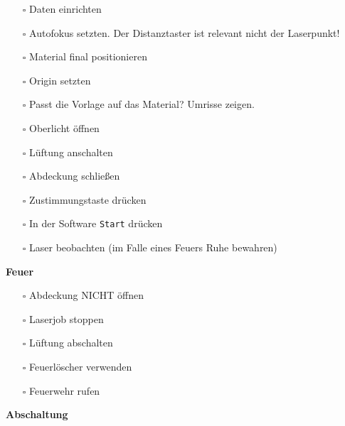 \documentclass[]{article}
\providecommand{\tightlist}{%
  \setlength{\itemsep}{0pt}\setlength{\parskip}{0pt}}
\begin{document}
\begin{itemize}
\tightlist
\item[$\square$]
  Daten einrichten\\
\item[$\square$]
  Autofokus setzten. Der Distanztaster ist relevant nicht der
  Laserpunkt!\\
\item[$\square$]
  Material final positionieren\\
\item[$\square$]
  Origin setzten\\
\item[$\square$]
  Passt die Vorlage auf das Material? Umrisse zeigen.
\item[$\square$]
  Oberlicht öffnen\\
\item[$\square$]
  Lüftung anschalten
\item[$\square$]
  Abdeckung schließen\\
\item[$\square$]
  Zustimmungstaste drücken\\
\item[$\square$]
  In der Software \texttt{Start} drücken\\
\item[$\square$]
  Laser beobachten (im Falle eines Feuers Ruhe bewahren)
\end{itemize}

\textbf{Feuer}

\begin{itemize}
\tightlist
\item[$\square$]
  Abdeckung NICHT öffnen\\
\item[$\square$]
  Laserjob stoppen\\
\item[$\square$]
  Lüftung abschalten\\
\item[$\square$]
  Feuerlöscher verwenden\\
\item[$\square$]
  Feuerwehr rufen
\end{itemize}

\textbf{Abschaltung}
\end{document}
